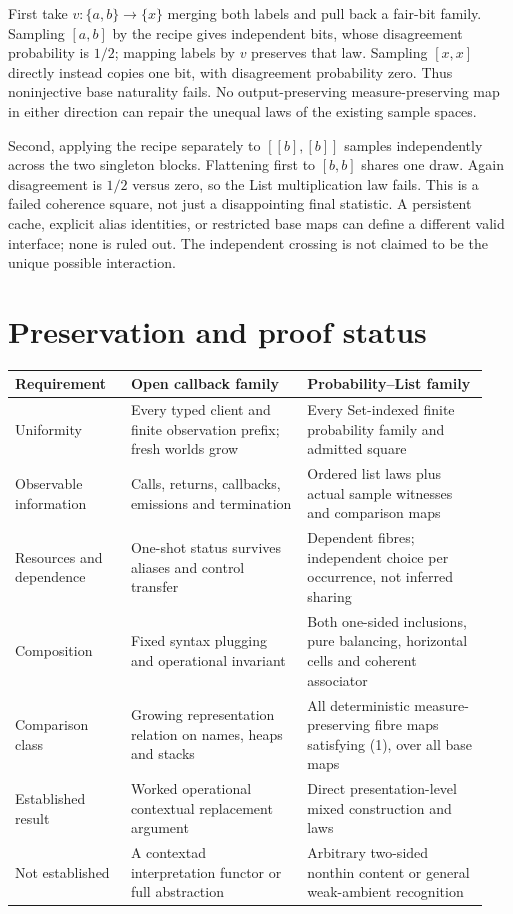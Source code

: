 \documentclass[11pt,a4paper]{article}
\begin{document}
First take \(v:\{a,b\}\to\{x\}\) merging both labels and pull back a
fair-bit family. Sampling \([a,b]\) by the recipe gives independent bits,
whose disagreement probability is \(1/2\); mapping labels by \(v\) preserves
that law. Sampling \([x,x]\) directly instead copies one bit, with disagreement
probability zero. Thus noninjective base naturality fails. No output-preserving
measure-preserving map in either direction can repair the unequal laws of the
existing sample spaces.

Second, applying the recipe separately to \([[b],[b]]\) samples independently
across the two singleton blocks. Flattening first to \([b,b]\) shares one
draw. Again disagreement is \(1/2\) versus zero, so the List multiplication
law fails. This is a failed coherence square, not just a disappointing final
statistic. A persistent cache, explicit alias identities, or restricted base
maps can define a different valid interface; none is ruled out. The independent
crossing is not claimed to be the unique possible interaction.

\section{Preservation and proof status}

\small
\begin{longtable}{@{}p{0.23\linewidth}p{0.35\linewidth}p{0.36\linewidth}@{}}
\toprule
Requirement & Open callback family & Probability--List family \\
\midrule
\endhead
Uniformity & Every typed client and finite observation prefix; fresh worlds grow & Every Set-indexed finite probability family and admitted square \\
Observable information & Calls, returns, callbacks, emissions and termination & Ordered list laws plus actual sample witnesses and comparison maps \\
Resources and dependence & One-shot status survives aliases and control transfer & Dependent fibres; independent choice per occurrence, not inferred sharing \\
Composition & Fixed syntax plugging and operational invariant & Both one-sided inclusions, pure balancing, horizontal cells and coherent associator \\
Comparison class & Growing representation relation on names, heaps and stacks & All deterministic measure-preserving fibre maps satisfying (1), over all base maps \\
Established result & Worked operational contextual replacement argument & Direct presentation-level mixed construction and laws \\
Not established & A contextad interpretation functor or full abstraction & Arbitrary two-sided nonthin content or general weak-ambient recognition \\
\bottomrule
\end{longtable}
\normalsize
\end{document}
